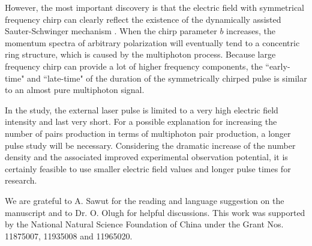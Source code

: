 \documentclass[aps,preprint,superscriptaddress]{revtex4}
\begin{document}
However, the most important discovery is that the electric field with symmetrical frequency chirp can clearly reflect the existence of the dynamically assisted Sauter-Schwinger mechanism \cite{Li:2014pp,Schutzhold:2008pz,Abdukerim:2012ke}. When the chirp parameter $b$ increases, the momentum spectra of arbitrary polarization will eventually tend to a concentric ring structure, which is caused by the multiphoton process. Because large frequency chirp can provide a lot of higher frequency components, the ``early-time" and ``late-time" of the duration of the symmetrically chirped pulse is similar to an almost pure multiphoton signal.

In the study, the external laser pulse is limited to a very high electric field intensity and last very short. For a possible explanation for increasing the number of pairs production in terms of multiphoton pair production, a longer pulse study will be necessary. Considering the dramatic increase of the number density and the associated improved experimental observation potential, it is certainly feasible to use smaller electric field values and longer pulse times for research.


\begin{acknowledgments}
\noindent

We are grateful to A. Sawut for the reading and language suggestion on the manuscript and to Dr. O. Olugh for helpful discussions. This work was supported by the National Natural Science Foundation of China under the Grant Nos. 11875007, 11935008 and 11965020.

\end{acknowledgments}
\end{document}

